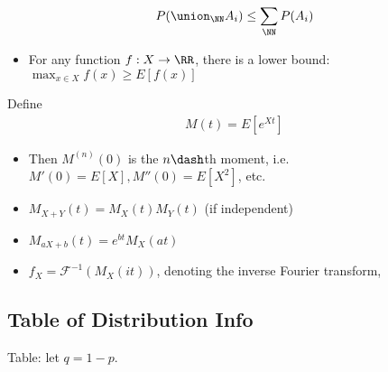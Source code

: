 \begin{proposition}

\begin{align*}
P(\union_\NN A_i) \leq \sum_\NN P(A_i)
\end{align*}

\end{proposition}

\begin{itemize}
\tightlist
\item
  For any function \(f:X \to \RR\), there is a lower bound:
  \(\max_{x\in X}f(x) \geq E[f(x)]\)
\end{itemize}

\begin{definition}

Define
\begin{align*}
M(t) = E[e^{Xt}]
\end{align*}

\begin{itemize}
\tightlist
\item
  Then \(M^{(n)}(0)\) is the \(n\dash\)th moment,
  i.e.~\(M'(0) = E[X], M''(0) = E[X^2]\), etc.
\item
  \(M_{X+Y}(t) = M_X(t)M_Y(t)\) (if independent)
\item
  \(M_{aX + b}(t) = e^{bt} M_X(at)\)
\item
  \(f_X = \mathcal{F}^{-1}(M_X(it))\), denoting the inverse Fourier
  transform,
\end{itemize}

\end{definition}

\hypertarget{table-of-distribution-info}{%
\subsection{Table of Distribution
Info}\label{table-of-distribution-info}}

Table: let \(q = 1-p\).

